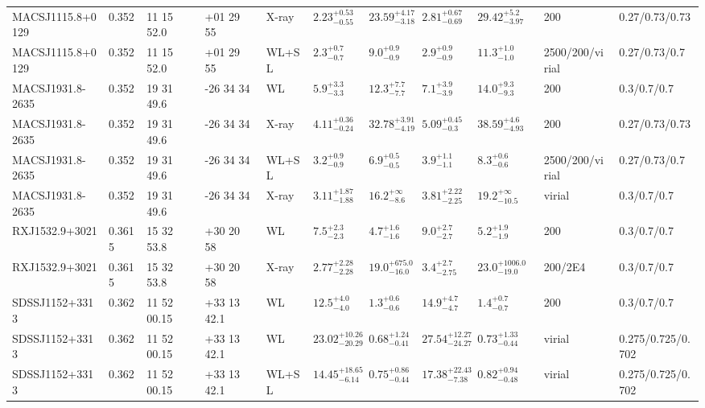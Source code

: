 \begin{landscape}
\begin{center}
{\begin{longtable}{llllllllllll}
MACSJ1115.8+0129 & 0.352 & 11 15 52.0 & +01 29 55 & X-ray & ${2.23}^{+0.53}_{-0.55}$ & ${23.59}^{+4.17}_{-3.18}$ & ${2.81}^{+0.67}_{-0.69}$ & ${29.42}^{+5.2}_{-3.97}$ & \citet{BA14.1} & 200 & 0.27/0.73/0.73 \\
MACSJ1115.8+0129 & 0.352 & 11 15 52.0 & +01 29 55 & WL+SL & ${2.3}^{+0.7}_{-0.7}$ & ${9.0}^{+0.9}_{-0.9}$ & ${2.9}^{+0.9}_{-0.9}$ & ${11.3}^{+1.0}_{-1.0}$ & \citet{ME14.1} & 2500/200/virial & 0.27/0.73/0.7 \\
MACSJ1931.8-2635 & 0.352 & 19 31 49.6 & -26 34 34 & WL & ${5.9}^{+3.3}_{-3.3}$ & ${12.3}^{+7.7}_{-7.7}$ & ${7.1}^{+3.9}_{-3.9}$ & ${14.0}^{+9.3}_{-9.3}$ & \citet{SE14.1} & 200 & 0.3/0.7/0.7 \\
MACSJ1931.8-2635 & 0.352 & 19 31 49.6 & -26 34 34 & X-ray & ${4.11}^{+0.36}_{-0.24}$ & ${32.78}^{+3.91}_{-4.19}$ & ${5.09}^{+0.45}_{-0.3}$ & ${38.59}^{+4.6}_{-4.93}$ & \citet{BA14.1} & 200 & 0.27/0.73/0.73 \\
MACSJ1931.8-2635 & 0.352 & 19 31 49.6 & -26 34 34 & WL+SL & ${3.2}^{+0.9}_{-0.9}$ & ${6.9}^{+0.5}_{-0.5}$ & ${3.9}^{+1.1}_{-1.1}$ & ${8.3}^{+0.6}_{-0.6}$ & \citet{ME14.1} & 2500/200/virial & 0.27/0.73/0.7 \\
MACSJ1931.8-2635 & 0.352 & 19 31 49.6 & -26 34 34 & X-ray & ${3.11}^{+1.87}_{-1.88}$ & ${16.2}^{+\infty}_{-8.6}$ & ${3.81}^{+2.22}_{-2.25}$ & ${19.2}^{+\infty}_{-10.5}$ & \citet{SC07.1} & virial & 0.3/0.7/0.7 \\
RXJ1532.9+3021 & 0.3615 & 15 32 53.8 & +30 20 58 & WL & ${7.5}^{+2.3}_{-2.3}$ & ${4.7}^{+1.6}_{-1.6}$ & ${9.0}^{+2.7}_{-2.7}$ & ${5.2}^{+1.9}_{-1.9}$ & \citet{SE14.1} & 200 & 0.3/0.7/0.7 \\
RXJ1532.9+3021 & 0.3615 & 15 32 53.8 & +30 20 58 & X-ray & ${2.77}^{+2.28}_{-2.28}$ & ${19.0}^{+675.0}_{-16.0}$ & ${3.4}^{+2.7}_{-2.75}$ & ${23.0}^{+1006.0}_{-19.0}$ & \citet{VO06.1} & 200/2E4 & 0.3/0.7/0.7 \\
SDSSJ1152+3313 & 0.362 & 11 52 00.15 & +33 13 42.1 & WL & ${12.5}^{+4.0}_{-4.0}$ & ${1.3}^{+0.6}_{-0.6}$ & ${14.9}^{+4.7}_{-4.7}$ & ${1.4}^{+0.7}_{-0.7}$ & \citet{SE14.1} & 200 & 0.3/0.7/0.7 \\
SDSSJ1152+3313 & 0.362 & 11 52 00.15 & +33 13 42.1 & WL & ${23.02}^{+10.26}_{-20.29}$ & ${0.68}^{+1.24}_{-0.41}$ & ${27.54}^{+12.27}_{-24.27}$ & ${0.73}^{+1.33}_{-0.44}$ & \citet{OG12.1} & virial & 0.275/0.725/0.702 \\
SDSSJ1152+3313 & 0.362 & 11 52 00.15 & +33 13 42.1 & WL+SL & ${14.45}^{+18.65}_{-6.14}$ & ${0.75}^{+0.86}_{-0.44}$ & ${17.38}^{+22.43}_{-7.38}$ & ${0.82}^{+0.94}_{-0.48}$ & \citet{OG12.1} & virial & 0.275/0.725/0.702 \\

\end{longtable}}
\end{center}
\end{landscape}
